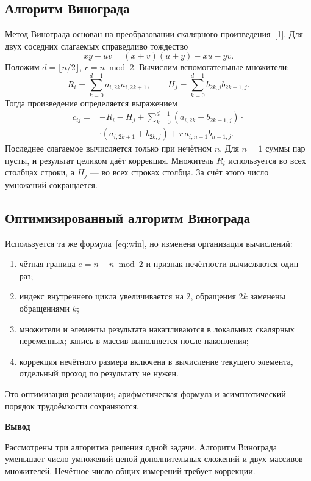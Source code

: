 \documentclass[14pt,a4paper]{extarticle}
\newcommand{\conclusion}[1]{\par\medskip\noindent\hspace*{\parindent}\textbf{Вывод}\par\indent #1\par}
\numberwithin{equation}{section}
\begin{document}
\subsection{Алгоритм Винограда}
Метод Винограда основан на преобразовании скалярного произведения~[1]. Для двух соседних слагаемых справедливо тождество
\begin{equation}
xy+uv=(x+v)(u+y)-xu-yv.
\end{equation}
Положим $d=\lfloor n/2\rfloor$, $r=n\bmod2$. Вычислим вспомогательные множители:
\begin{equation}\label{eq:factors}
R_i=\sum_{k=0}^{d-1}a_{i,2k}a_{i,2k+1},\qquad
H_j=\sum_{k=0}^{d-1}b_{2k,j}b_{2k+1,j}.
\end{equation}
Тогда произведение определяется выражением
\begin{equation}\label{eq:win}
\begin{split}
c_{ij}={}&-R_i-H_j+\sum_{k=0}^{d-1}
(a_{i,2k}+b_{2k+1,j})\cdot{}\\
&\cdot(a_{i,2k+1}+b_{2k,j})+r\,a_{i,n-1}b_{n-1,j}.
\end{split}
\end{equation}
Последнее слагаемое вычисляется только при нечётном $n$. Для $n=1$ суммы пар пусты, и результат целиком даёт коррекция. Множитель $R_i$ используется во всех столбцах строки, а $H_j$ — во всех строках столбца. За счёт этого число умножений сокращается.

\subsection{Оптимизированный алгоритм Винограда}
Используется та же формула~\eqref{eq:win}, но изменена организация вычислений:
\begin{enumerate}
\item чётная граница $e=n-n\bmod2$ и признак нечётности вычисляются один раз;
\item индекс внутреннего цикла увеличивается на 2, обращения $2k$ заменены обращениями $k$;
\item множители и элементы результата накапливаются в локальных скалярных переменных; запись в массив выполняется после накопления;
\item коррекция нечётного размера включена в вычисление текущего элемента, отдельный проход по результату не нужен.
\end{enumerate}
Это оптимизация реализации; арифметическая формула и асимптотический порядок трудоёмкости сохраняются.
\conclusion{Рассмотрены три алгоритма решения одной задачи. Алгоритм Винограда уменьшает число умножений ценой дополнительных сложений и двух массивов множителей. Нечётное число общих измерений требует коррекции.}
\end{document}
